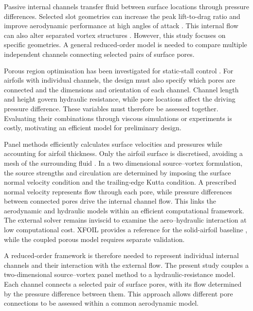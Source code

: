 \documentclass[a4paper,fleqn]{cas-dc}
\begin{document}
Passive internal channels transfer fluid between surface locations through pressure differences. 
Selected slot geometries can increase the peak lift-to-drag ratio and improve aerodynamic performance at high angles of attack \cite{Acarer2020DU12W262PassiveFlow,Bahadi2026CurvedPassiveSlot}. 
This internal flow can also alter separated vortex structures \cite{Kestel2020PassiveBleeding}.
However, this study focuses on specific geometries. 
A general reduced-order model is needed to compare multiple independent channels connecting selected pairs of surface pores.


Porous region optimisation has been investigated for static-stall control \cite{Zamani2026NACA0015PorousStall}. 
For airfoils with individual channels, the design must also specify which pores are connected and the dimensions and orientation of each channel. 
Channel length and height govern hydraulic resistance, while pore locations affect the driving pressure difference. 
These variables must therefore be assessed together. 
Evaluating their combinations through viscous simulations or experiments is costly, motivating an efficient model for preliminary design.

Panel methods efficiently calculates surface velocities and pressures while accounting for airfoil thickness. Only the airfoil surface is discretised, avoiding a mesh of the surrounding fluid \cite{HessSmith1967PotentialFlow,Hess1990PanelMethods,Birk2022HessSmithGuide}. 
In a two dimensional source--vortex formulation, the source strengths and circulation are determined by imposing the surface normal velocity condition and the trailing-edge Kutta condition. 
A prescribed normal velocity represents flow through each pore, while pressure differences between connected pores drive the internal channel flow. 
This links the aerodynamic and hydraulic models within an efficient computational framework. 
The external solver remains inviscid to examine the aero--hydraulic interaction at low computational cost. 
XFOIL provides a reference for the solid-airfoil baseline \cite{Drela1989XFOIL}, while the coupled porous model requires separate validation.

A reduced-order framework is therefore needed to represent individual internal channels and their interaction with the external flow. 
The present study couples a two-dimensional source--vortex panel method to a hydraulic-resistance model. 
Each channel connects a selected pair of surface pores, with its flow determined by the pressure difference between them. This approach allows different pore connections to be assessed within a common aerodynamic model.
\end{document}
